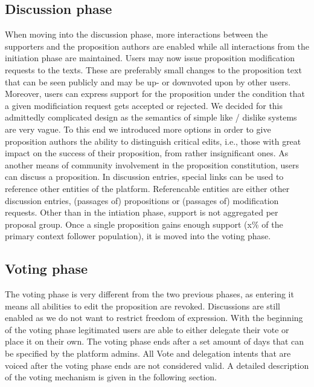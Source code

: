 
\subsection{Discussion phase}
\label{ssec:Lifecycle_Discussion}

When moving into the discussion phase, more interactions between the supporters and the proposition authors are enabled while all interactions from the initiation phase are maintained.
Users may now issue proposition modification requests to the texts.
These are preferably small changes to the proposition text that can be seen publicly and may be up- or downvoted upon by other users.
Moreover, users can express support for the proposition under the condition that a given modificiation request gets accepted or rejected.
We decided for this admittedly complicated design as the semantics of simple like / dislike systems are very vague.
To this end we introduced more options in order to give proposition authors the ability to distinguish critical edits, i.e., those with great impact on the success of their proposition, from rather insignificant ones.
As another means of community involvement in the proposition constitution, users can discuss a proposition.
In discussion entries, special links can be used to reference other entities of the platform.
Referencable entities are either other discussion entries, (passages of) propositions or (passages of) modification requests.
Other than in the intiation phase, support is not aggregated per proposal group.
Once a single proposition gains enough support (x\% of the primary context follower population), it is moved into the voting phase.

\subsection{Voting phase}
\label{ssec:Lifecycle_Voting}

The voting phase is very different from the two previous phases, as entering it means all abilities to edit the proposition are revoked.
Discussions are still enabled as we do not want to restrict freedom of expression.
With the beginning of the voting phase legitimated users are able to either delegate their vote or place it on their own.
The voting phase ends after a set amount of days that can be specified by the platform admins.
All Vote and delegation intents that are voiced after the voting phase ends are not considered valid.
A detailed description of the voting mechanism is given in the following section.

